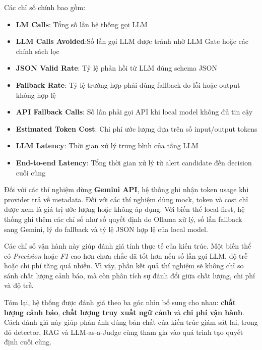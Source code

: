 Các chỉ số chính bao gồm:
\begin{itemize}[label=--]
    \item \textbf{LM Calls}: Tổng số lần hệ thống gọi LLM
\item \textbf{LLM Calls Avoided}:Số lần gọi LLM được tránh nhờ LLM Gate hoặc các chính sách lọc
\item \textbf{JSON Valid Rate}: Tỷ lệ phản hồi từ LLM đúng schema JSON
\item \textbf{Fallback Rate}: Tỷ lệ trường hợp phải dùng fallback do lỗi hoặc output không hợp lệ
\item \textbf{API Fallback Calls}: Số lần phải gọi API khi local model không đủ tin cậy
\item \textbf{Estimated Token Cost}: Chi phí ước lượng dựa trên số input/output tokens
\item \textbf{LLM Latency}: Thời gian xử lý trung bình của tầng LLM
\item \textbf{End-to-end Latency}: Tổng thời gian xử lý từ alert candidate đến decision cuối cùng
\end{itemize}
Đối với các thí nghiệm dùng \textbf{Gemini API}, hệ thống ghi nhận token usage khi provider trả về metadata. Đối với các thí nghiệm dùng mock, token và cost chỉ được xem là giá trị ước lượng hoặc không áp dụng. Với biến thể local-first, hệ thống ghi thêm các chỉ số như số quyết định do Ollama xử lý, số lần fallback sang Gemini, lý do fallback và tỷ lệ JSON hợp lệ của local model.

Các chỉ số vận hành này giúp đánh giá tính thực tế của kiến trúc. Một biến thể có \textit{Precision} hoặc \textit{F1} cao hơn chưa chắc đã tốt hơn nếu số lần gọi LLM, độ trễ hoặc chi phí tăng quá nhiều. Vì vậy, phần kết quả thí nghiệm sẽ không chỉ so sánh chất lượng cảnh báo, mà còn phân tích sự đánh đổi giữa chất lượng, chi phí và độ trễ.

Tóm lại, hệ thống được đánh giá theo ba góc nhìn bổ sung cho nhau: \textbf{chất lượng cảnh báo},\textbf{ chất lượng truy xuất ngữ cảnh} và \textbf{chi phí vận hành}. Cách đánh giá này giúp phản ánh đúng bản chất của kiến trúc giám sát lai, trong đó detector, RAG và LLM-as-a-Judge cùng tham gia vào quá trình tạo quyết định cuối cùng.
